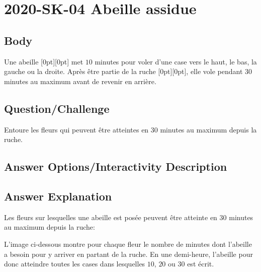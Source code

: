\documentclass[a4paper,11pt]{report}
\newcommand{\taskGraphicsFolder}{..}
\begin{document}
\section*{\centering{} 2020-SK-04 Abeille assidue}


\subsection*{Body}

Une abeille \raisebox{-0.5ex}[0pt][0pt]{} met $10$ minutes pour voler d’une case vers le haut, le bas, la gauche ou la droite. Après être partie de la ruche \raisebox{-0.5ex}[0pt][0pt]{}, elle vole pendant $30$ minutes au maximum avant de revenir en arrière.

{\em

\subsection*{Question/Challenge}

Entoure les fleurs qui peuvent être atteintes en 30 minutes au maximum depuis la ruche.

{\centering%
\par}

}\begingroup
\renewcommand{\arraystretch}{1.5}
\subsection*{Answer Options/Interactivity Description}



\endgroup

\subsection*{Answer Explanation}

Les fleurs sur lesquelles une abeille est posée peuvent être atteinte en $30$ minutes au maximum depuis la ruche:

{\centering%
\par}

L’image ci-dessous montre pour chaque fleur le nombre de minutes dont l’abeille a besoin pour y arriver en partant de la ruche. En une demi-heure, l’abeille pour donc atteindre toutes les cases dans lesquelles $10$, $20$ ou $30$ est écrit.
\end{document}
